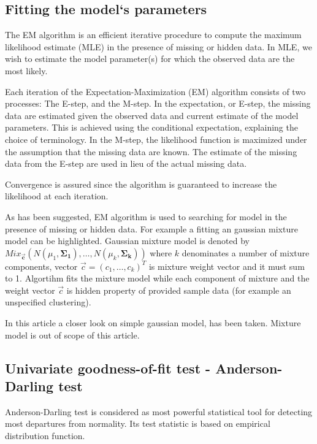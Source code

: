 \documentclass[a4paper,journal]{IEEEtran}
\begin{document}
\subsection{Fitting the model`s parameters}
The EM algorithm is an efficient iterative procedure to compute the maximum likelihood estimate (MLE) in the
presence of missing or hidden data. In MLE, we wish to estimate the model parameter(s) for which the observed
data are the most likely.

Each iteration of the Expectation-Maximization (EM) algorithm consists of two processes: 
The E-step, and the M-step. In the expectation, or E-step, the missing data are estimated given the observed 
data and current estimate of the model parameters. 
This is achieved using the conditional expectation, explaining the choice of terminology.
In the M-step, the likelihood function is maximized under the assumption that the missing data are known. 
The estimate of the missing data from the E-step are used in lieu of the actual missing data.

Convergence is assured since the algorithm is guaranteed to increase the likelihood at each iteration.

As has been suggested, EM algorithm is used to searching for model in the presence of missing or hidden data.
For example a fitting an gaussian mixture model can be highlighted. Gaussian mixture model is denoted by
$ Mix_{\mathbf{\vec{c}}}(N(\mu_1,\mathbf{\Sigma_1}),\ldots,N(\mu_k,\mathbf{\Sigma_k})) $ where $k$ denominates a number
of mixture components, vector $\vec{c} = (c_1,\ldots,c_k)^T$ is mixture weight vector and it must sum to 1.
Algortihm fits the mixture model while each component of mixture and the weight vector $\vec{c}$
is hidden property of provided sample data (for example an unspecified clustering).

In this article a closer look on simple gaussian model, has been taken. 
Mixture model is out of scope of this article.

\subsection{Univariate goodness-of-fit test - Anderson-Darling test}
Anderson-Darling test is considered as most powerful statistical tool for detecting most departures from normality. 
\cite{Ste74} Its test statistic is based on empirical distribution function.
\end{document}
